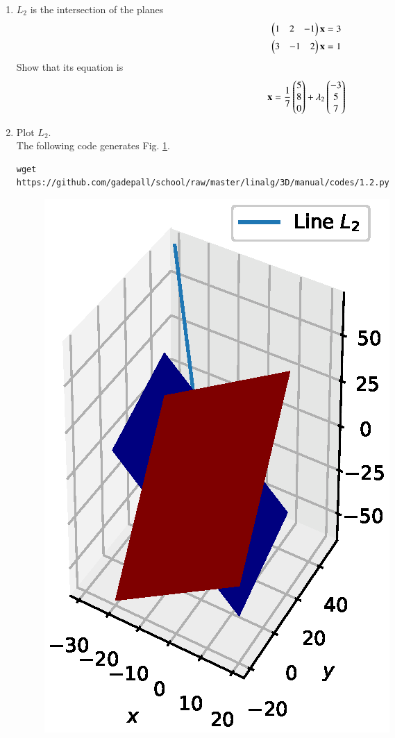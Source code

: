 \documentclass[journal,12pt,twocolumn]{IEEEtran}
\renewcommand\thesection{\arabic{section}}
\begin{document}
\begin{enumerate}[label=\thesection.\arabic*
,ref=\thesection.\theenumi]
\item $L_2$ is the intersection of the planes
\begin{align}
\begin{pmatrix}1 & 2 & -1\end{pmatrix}\mathbf{x} &= 3
\\
\begin{pmatrix}3 & -1 & 2\end{pmatrix}\mathbf{x} &= 1
\end{align}
Show that its equation is
%
\begin{align}
\mathbf{x} = \frac{1}{7}\begin{pmatrix} 5 \\ 8 \\ 0\end{pmatrix} + \lambda_2 \begin{pmatrix} -3 \\ 5 \\ 7\end{pmatrix}
\label{eq:l2}
\end{align}
\item Plot 
$L_2$.
\\
\solution The following code generates Fig. \ref{fig:1.2}.
\begin{lstlisting}
wget 
https://github.com/gadepall/school/raw/master/linalg/3D/manual/codes/1.2.py
\end{lstlisting}
\begin{figure}[!ht]
\centering
\includegraphics[width=\columnwidth]{./figs/1.2.eps}
\caption{}
\label{fig:1.2}
\end{figure}


\end{enumerate}
\end{document}
